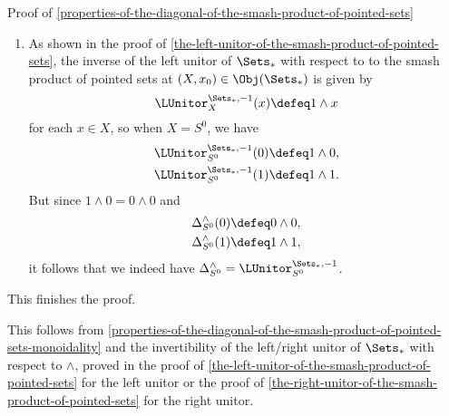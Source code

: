 \begin{Proof}{Proof of \cref{properties-of-the-diagonal-of-the-smash-product-of-pointed-sets}}
\begin{enumerate}
\[\begin{tikzcd}[row sep={5.0*\the\DL,between origins}, column sep={9.0*\the\DL,between origins}, background color=backgroundColor, ampersand replacement=\&]
                    \arrow[d,mapsto]
                    \\
                    \&
                    (x\wedge y)\wedge(x\wedge y)
                \end{tikzcd}
            \]%
            and hence indeed commutes.
        \item\label{proof-of-properties-of-the-diagonal-of-the-smash-product-of-pointed-sets-monoidality-2}As shown in the proof of \cref{the-left-unitor-of-the-smash-product-of-pointed-sets}, the inverse of the left unitor of $\Sets_{*}$ with respect to to the smash product of pointed sets at $(X,x_{0})\in\Obj(\Sets_{*})$ is given by
            \[
                \LUnitor^{\Sets_{*},-1}_{X}(x)%
                \defeq%
                1\wedge x
            \]%
            for each $x\in X$, so when $X=S^{0}$, we have
            \begin{align*}
                \LUnitor^{\Sets_{*},-1}_{S^{0}}(0) &\defeq 1\wedge0,\\
                \LUnitor^{\Sets_{*},-1}_{S^{0}}(1) &\defeq 1\wedge1.
            \end{align*}
            But since $1\wedge0=0\wedge0$ and
            \begin{align*}
                \Delta^{\wedge}_{S^{0}}(0) &\defeq 0\wedge0,\\
                \Delta^{\wedge}_{S^{0}}(1) &\defeq 1\wedge1,
            \end{align*}
            it follows that we indeed have $\Delta^{\wedge}_{S^{0}}=\LUnitor^{\Sets_{*},-1}_{S^{0}}$.
    \end{enumerate}
    This finishes the proof.

    This follows from \cref{properties-of-the-diagonal-of-the-smash-product-of-pointed-sets-monoidality} and the invertibility of the left/right unitor of $\Sets_{*}$ with respect to $\wedge$, proved in the proof of \cref{the-left-unitor-of-the-smash-product-of-pointed-sets} for the left unitor or the proof of \cref{the-right-unitor-of-the-smash-product-of-pointed-sets} for the right unitor.
\end{Proof}
